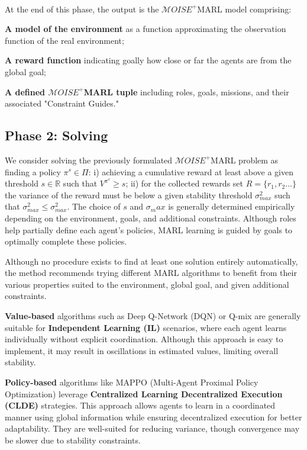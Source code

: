 \documentclass[sigconf,anonymous]{aamas}
\begin{document}
\

At the end of this phase, the output is the $\mathcal{M}OISE^+$MARL model comprising:
\begin{enumerate*}[label={\roman*)}]
    \item \textbf{A model of the environment} as a function approximating the observation function of the real environment;
    \item \textbf{A reward function} indicating goally how close or far the agents are from the global goal;
    \item \textbf{A defined $\mathcal{M}OISE^+$MARL tuple} including roles, goals, missions, and their associated "Constraint Guides."
\end{enumerate*}

\subsection{Phase 2: Solving}

We consider solving the previously formulated $\mathcal{M}OISE^+$MARL problem as finding a policy $\pi^s \in \Pi$: \quad i) achieving a cumulative reward at least above a given threshold $s \in \mathbb{R}$ such that $V^{\pi^s} \geq s$; \quad ii) for the collected rewards set $R = \{r_1, r_2\dots\}$ the variance of the reward must be below a given stability threshold $\sigma_{max}^2$ such that $\sigma_{max}^2 \leq \sigma_{max}^2$. The choice of $s$ and $\sigma_max$ is generally determined empirically depending on the environment, goals, and additional constraints. Although roles help partially define each agent's policies, MARL learning is guided by goals to optimally complete these policies.

Although no procedure exists to find at least one solution entirely automatically, the method recommends trying different MARL algorithms to benefit from their various properties suited to the environment, global goal, and given additional constraints.

\textbf{Value-based} algorithms such as Deep Q-Network (DQN) or Q-mix are generally suitable for \textbf{Independent Learning (IL)} scenarios, where each agent learns individually without explicit coordination. Although this approach is easy to implement, it may result in oscillations in estimated values, limiting overall stability.

\textbf{Policy-based} algorithms like MAPPO (Multi-Agent Proximal Policy Optimization) leverage \textbf{Centralized Learning Decentralized Execution (CLDE)} strategies. This approach allows agents to learn in a coordinated manner using global information while ensuring decentralized execution for better adaptability. They are well-suited for reducing variance, though convergence may be slower due to stability constraints.
\end{document}
